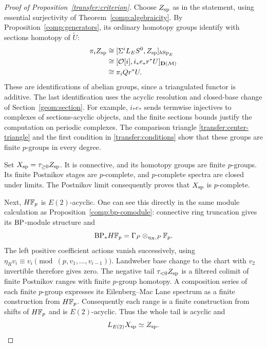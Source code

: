 \begin{proof}[Proof of Proposition~\ref{transfer:criterion}]
Choose $Z_{\rm sp}$ as in the statement, using essential
surjectivity of Theorem~\ref{comp:algebraicity}. By
Proposition~\ref{comp:generators}, its ordinary homotopy groups
identify with sections homotopy of $\widetilde U$:
\[
 \begin{aligned}
 \pi_i Z_{\rm sp}
 &\cong[\Sigma^iL_ES^0,Z_{\rm sp}]_{h\mathrm{Sp}_E}\\
 &\cong[\mathcal O[i],i_*e_*r^*U]_{\mathbf D(\mathcal M)}\\
 &\cong\pi_i Qr^*U.
 \end{aligned}
\]
These are identifications of abelian groups, since a triangulated
functor is additive. The last identification uses the acyclic
resolution and closed-base
change of Section~\ref{geom:section}. For example, $i_*e_*$ sends
termwise injectives to complexes of sections-acyclic objects, and the
finite sections bounds justify the computation on periodic complexes.
The comparison triangle \eqref{transfer:center-triangle} and the
first condition in \eqref{transfer:conditions} show that these groups
are finite $p$-groups in every degree.

Set $X_{\rm sp}=\tau_{\geq0}Z_{\rm sp}$. It is connective,
and its homotopy groups are finite $p$-groups. Its finite Postnikov
stages are $p$-complete, and $p$-complete spectra are closed under
limits. The Postnikov limit consequently proves that $X_{\rm sp}$
is $p$-complete.

Next, $H\mathbb F_p$ is $E(2)$-acyclic. One can see this directly in the
same module calculation as Proposition~\ref{comp:bp-comodule}:
connective ring truncation gives its $\mathrm{BP}$-module structure and
\[
 \mathrm{BP}_*H\mathbb F_p=\Gamma_P\otimes_{\eta_R,P}\mathbb F_p.
\]
The left positive coefficient actions vanish successively, using
$\eta_Rv_i\equiv v_i\pmod{(p,v_1,\ldots,v_{i-1})}$.
Landweber base change to the chart with $v_2$ invertible therefore
gives zero. The negative tail $\tau_{<0}Z_{\rm sp}$ is a filtered
colimit of finite Postnikov ranges with finite $p$-group homotopy.
A composition series of each finite $p$-group expresses its
Eilenberg--Mac Lane spectrum as a finite construction from $H\mathbb F_p$.
Consequently each range is a finite construction from shifts of
$H\mathbb F_p$ and is $E(2)$-acyclic. Thus the whole tail is acyclic and
\[
 L_{E(2)}X_{\rm sp}\simeq Z_{\rm sp}.
\]


\end{proof}

